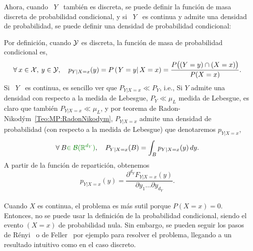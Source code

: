 Ahora, cuando  \ $Y$ \ tambi\'en es  discreta, se puede definir  la funci\'on de
masa discreta de probabilidad condicional, y si \ $Y$ \ es continua y admite una
densidad  de  probabilidad,  se  puede  definir  una  densidad  de  probabilidad
condicional:
%
\begin{definicion}
\label{Def:MP:ReparticionCondicionalDiscreta}
%
  Por  definici\'on,  cuando  $\mathcal{Y}$  es   discreta,  la  funci\'on  de  masa  de
  probabilidad condicional  es,
  \[
  \forall \: x \in \mathcal{X}, \: y \in \mathcal{Y}, \quad p_{Y|X=x}(y) = P\left( \left. Y = y \right|
  X  =  x \right)  =  \frac{P\big(  (Y  = y)  \cap  (X =  x) \big)}{P(X = x)}.
  \]
  Si  \ $Y$  \  es continua,  es sencillo  ver  que $P_{Y|X=x}  \ll P_Y$,  i.e.,
     Si $Y$ admite una densidad con respecto  a la medida de
    Lebesgue,  $P_Y  \ll \mu_L$  medida  de  Lebesgue,  es claro  que  tambi\'en
    $P_{Y|X=x}       \ll       \mu_L$,        y       por       teorema       de
    Radon-Nikod\'ym~\ref{Teo:MP:RadonNikodym},  $P_{Y|X=x}$ admite  una densidad
    de  probabilidad (con  respecto a  la  medida de  Lebesgue) que  denotaremos
    $p_{Y|X=x}$,
  \[
  \forall  \:  B  \modif{\in   \B(\Rset^{d_Y})},  \quad  P_{Y|X=x}(B)  =  \int_B
  p_{Y|X=x}(y) \, dy.
  \]
  A partir de la funci\'on de repartici\'on, obtenemos
  \[
  p_{Y|X=x}(y) = \frac{\partial^{d_Y} F_{Y|X=x}(y)}{\partial y_1 \ldots \partial
    y_{d_Y}}.
  \]
\end{definicion}



\paragraph{}
Cuando  $X$  es   continua,  el  problema  es  m\'as   sutil  porque  $P(X=x)  =
0$. Entonces, no  se puede usar la definici\'on  de la probabilidad condicional,
siendo el  evento $(X=x)$ de probabilidad  nula.  Sin embargo,  se pueden seguir
los  pasos de R\'enyi~\cite[Cap.~5]{Ren}  o de  Feller~\cite[Cap.~10]{Fel71} por
ejemplo para resolver el problema, llegando  a un
resultado intuitivo como en el caso discreto.

